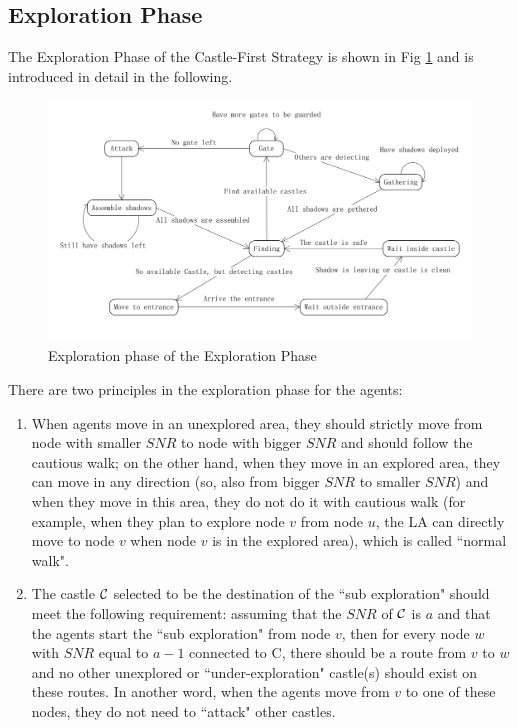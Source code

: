 
\subsection{ Exploration Phase}
The Exploration Phase of the Castle-First Strategy is shown in Fig \ref{fig:castlestates} 
and is introduced in detail in the following.
\begin{figure}[H]
  \centering  
  \includegraphics[width=6.0in]{figures/castlestates.png}
  \caption{Exploration phase of the Exploration Phase}\label{fig:castlestates}
\end{figure} 
 
There are two principles in the exploration phase for the agents:
\begin{enumerate}
\item When agents move in an unexplored area, they should strictly move from node with smaller $SNR$ to node with bigger $SNR$ and should follow the cautious walk; on the other hand,  when they move in an explored area, they can move in  any direction   (so, also from bigger $SNR$ to smaller $SNR$) and when they  move in this area, they  do not do it with cautious walk  (for example, when they plan to explore node $v$ from node $u$, the LA can directly move to node $v$ when node $v$ is in the explored area), which is called ``normal walk".
\item The castle ${\cal C}$ selected to be the destination of the ``sub exploration" should meet  the following requirement: assuming that the $SNR$ of ${\cal C}$ is $a$ and 
that the agents start the  ``sub exploration" from node  $v$, 
 then for every node $w$ with $SNR$ equal to $a-1$ connected to {\cal C}, there should be a route from   $v$ to $w$    and no other unexplored or ``under-exploration" castle(s)  should exist on these routes. In another word, when the agents move from $v$ to one of these nodes,   they do not  need to ``attack" other castles. 
\end{enumerate}  

